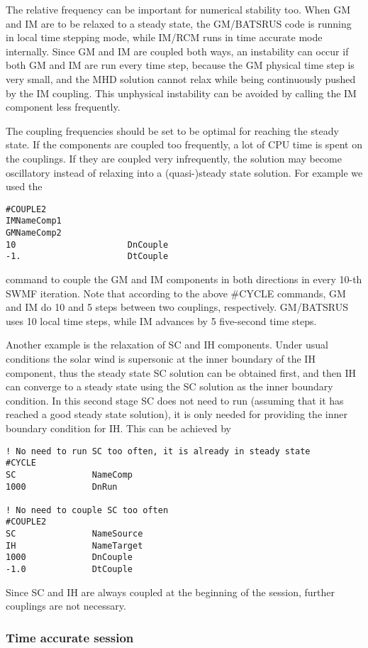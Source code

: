 The relative frequency can be important for numerical
stability too. When GM and IM are to be relaxed
to a steady state, the GM/BATSRUS code is running in 
local time stepping mode, while IM/RCM runs in time 
accurate mode internally. Since GM and IM are coupled
both ways, an instability can occur if both GM and IM
are run every time step, because the GM physical time
step is very small, and the MHD solution cannot relax
while being continuously pushed by the IM coupling.
This unphysical instability can be avoided by calling the
IM component less frequently.

The coupling frequencies should be set to be optimal
for reaching the steady state. If the components are
coupled too frequently, a lot of CPU time is spent
on the couplings. If they are coupled very infrequently,
the solution may become oscillatory instead of relaxing
into a (quasi-)steady state solution. For example
we used the
\begin{verbatim}
#COUPLE2
IMNameComp1
GMNameComp2
10                      DnCouple
-1.                     DtCouple
\end{verbatim}
command to couple the GM and IM components in both directions
in every 10-th SWMF iteration.
Note that according to the above \#CYCLE commands,
GM and IM do 10 and 5 steps between two couplings,
respectively. GM/BATSRUS uses 10 local time steps,
while IM advances by 5 five-second time steps.

Another example is the relaxation of SC and IH components.
Under usual conditions the solar wind is supersonic at the 
inner boundary of the IH component, thus the steady state SC
solution can be obtained first, and then IH can converge
to a steady state using the SC solution as the inner boundary 
condition. In this second stage SC does not need to run
(assuming that it has reached a good steady state solution),
it is only needed for providing the inner boundary condition for IH.
This can be achieved by
\begin{verbatim}
! No need to run SC too often, it is already in steady state
#CYCLE
SC               NameComp
1000             DnRun

! No need to couple SC too often
#COUPLE2
SC               NameSource
IH               NameTarget
1000             DnCouple
-1.0             DtCouple
\end{verbatim}
Since SC and IH are always coupled at the beginning of the session,
further couplings are not necessary.

\subsubsection{Time accurate session}

